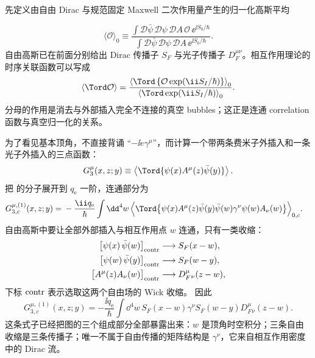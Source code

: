 \begin{derivation}
先定义由自由 Dirac 与规范固定 Maxwell 二次作用量产生的归一化高斯平均

\begin{equation*}
 \langle\mathcal O\rangle_0
 \equiv
 \frac{\displaystyle
 \int\mathcal D\bar\psi\,\mathcal D\psi\,\mathcal DA\,
 \mathcal O\,\ee^{\ii S_0/\hbar}}
 {\displaystyle
 \int\mathcal D\bar\psi\,\mathcal D\psi\,\mathcal DA\,
 \ee^{\ii S_0/\hbar}}.
 \end{equation*}
自由高斯已在前面分别给出 Dirac 传播子 $S_F$ 与光子传播子 $D_F^{\mu\nu}$。相互作用理论的时序关联函数可以写成
\begin{equation*}
 {
 \langle\Tord\mathcal O\rangle
 =\frac{
 \left\langle\Tord\left\{\mathcal O
 \exp\!\left(\ii S_I/\hbar\right)\right\}\right\rangle_0}
 {\left\langle\Tord\exp\!\left(\ii S_I/\hbar\right)\right\rangle_0}.}
 \end{equation*}
分母的作用是消去与外部插入完全不连接的真空 bubbles；这正是连通 correlation 函数与真空归一化的关系。

为了看见基本顶角，不直接背诵 ``$-\ii e\gamma^\mu$''，而计算一个带两条费米子外插入和一条光子外插入的三点函数：
\begin{equation*}
 G_3^\mu(x,z;y)
 \equiv
 \left\langle
 \Tord\{\psi(x)A^\mu(z)\bar\psi(y)\}
 \right\rangle .
 \end{equation*}
把 的分子展开到 $q_{\mathrm e}$ 一阶，连通部分为
\begin{align*}
 G_{3,c}^{\mu,(1)}(x,z;y)
 ={}&-\frac{\ii q_{\mathrm e}}{\hbar}
 \int\dd^4 w\,
 \Big\langle\Tord\big\{
 \psi(x)A^\mu(z)\bar\psi(y)
 \bar\psi(w)\gamma^\nu\psi(w)A_\nu(w)
 \big\}\Big\rangle_{0,c}.
 \end{align*}
自由高斯中要让全部外部插入与相互作用点 $w$ 连通，只有一类收缩：
\begin{align*}
 \bigl[\psi(x)\,\bar\psi(w)\bigr]_{\rm contr}&\longrightarrow S_F(x-w),\\
 \bigl[\psi(w)\,\bar\psi(y)\bigr]_{\rm contr}&\longrightarrow S_F(w-y),\\
 \bigl[A^\mu(z)A_\nu(w)\bigr]_{\rm contr}&\longrightarrow D_F^{\mu}{}_{\nu}(z-w),
\end{align*}
下标 $\rm contr$ 表示选取这两个自由场的 Wick 收缩。
因此
\begin{equation*}
 {
 G_{3,c}^{\mu,(1)}(x,z;y)
 =-\frac{\ii q_{\mathrm e}}{\hbar}
 \int\dd^4 w\,
 S_F(x-w)\gamma^\nu S_F(w-y)
 D_F^{\mu}{}_{\nu}(z-w).}
 \end{equation*}
这条式子已经把图的三个组成部分全部暴露出来：$w$ 是顶角时空积分；三条自由收缩是三条传播子；唯一不属于自由传播的矩阵结构是 $\gamma^\nu$，它来自相互作用密度中的 Dirac 流。


\end{derivation}
